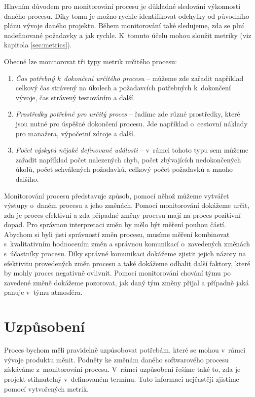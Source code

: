 \documentclass[czech,master]{diploma}
\begin{document}
Hlavním důvodem pro monitorování procesu je důkladné sledování výkonnosti daného procesu. Díky tomu je možno rychle identifikovat odchylky od původního plánu vývoje daného projektu. Během monitorování také sledujeme, zda se plní nadefinované požadavky a jak rychle. K~tomuto účelu mohou sloužit metriky (viz kapitola \ref{sec:metrics}).

Obecně lze monitorovat tři typy metrik určitého procesu:

\begin{enumerate}
\item \textit{Čas potřebný k~dokončení určitého procesu} -- můžeme zde zařadit například celkový čas strávený na úkolech a požadavcích potřebných k~dokončení vývoje, čas strávený testováním a další.

\item \textit{Prostředky potřebné pro určitý proces} -- řadíme zde různé prostředky, které jsou nutné pro úspěšné dokončení procesu. Jde například o~cestovní náklady pro manažera, výpočetní zdroje a další.

\item \textit{Počet výskytů nějaké definované události} -- v~rámci tohoto typu sem můžeme zařadit například počet nalezených chyb, počet zbývajících nedokončených úkolů, počet schválených požadavků, celkový počet požadavků a mnoho dalšího.
\end{enumerate}

Monitorování procesu představuje způsob, pomocí něhož můžeme vytvářet výstupy o~daném procesu a jeho změnách. Pomocí monitorování dokážeme určit, zda je proces efektivní a zda případné změny procesu mají na proces pozitivní dopad. Pro správnou interpretaci změn by mělo být měření pouhou částí. Abychom si byli jisti správností změn procesu, musíme měření kombinovat s~kvalitativním hodnocením změn a správnou komunikací o~zavedených změnách s~účastníky procesu. Díky správné komunikaci dokážeme zjistit jejich názory na efektivitu provedených změn procesu a také dokážeme odhalit další faktory, které by mohly proces negativně ovlivnit. Pomocí monitorování chování týmu po zavedené změně dokážeme pozorovat, jak daný tým změny přijal a případně jaká panuje v~týmu atmosféra.

\section{Uzpůsobení}
\label{sec:control}
Proces bychom měli pravidelně uzpůsobovat potřebám, které se mohou v~rámci vývoje produktu měnit. Podněty ke změnám daného softwarového procesu získáváme z~monitorování procesu. V~rámci uzpůsobení řešíme také to, zda je projekt stihnutelný v~definovaném termínu. Tuto informaci nejčastěji zjistíme pomocí vytvořených metrik.
\end{document}
